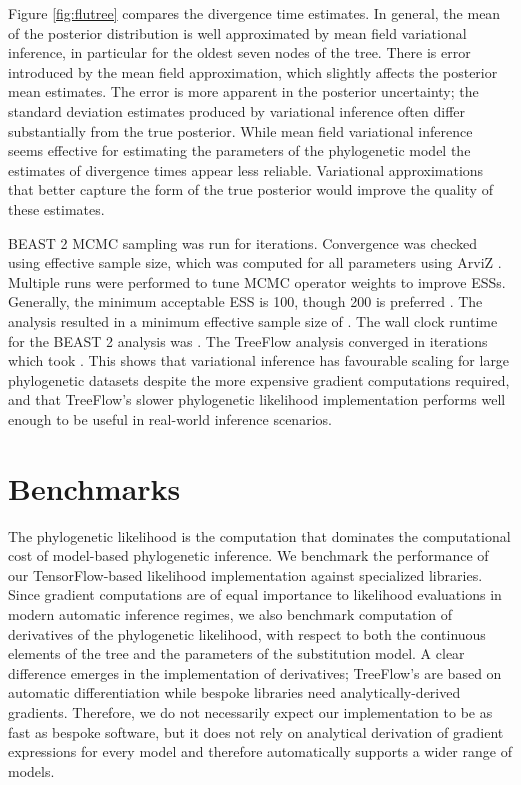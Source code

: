 Figure \ref{fig:flutree} compares the divergence time estimates. In general, the mean of the posterior distribution is well approximated by mean field variational inference, in particular for the oldest seven nodes of the tree. There is error introduced by the mean field approximation, which slightly affects the posterior mean estimates. The error is more apparent in the posterior uncertainty; the standard deviation estimates produced by variational inference often differ substantially from the true posterior. While mean field variational inference seems effective for estimating the parameters of the phylogenetic model the estimates of divergence times appear less reliable. Variational approximations that better capture the form of the true posterior would improve the quality of these estimates.

BEAST 2 MCMC sampling was run for  iterations. Convergence was checked using effective sample size, which was computed for all parameters using ArviZ \cite{kumar2019arviz}. Multiple runs were performed to tune MCMC operator weights to improve ESSs. Generally, the minimum acceptable ESS is 100, though 200 is preferred \cite{drummond2015bayesian}. The analysis resulted in a minimum effective sample size of . The wall clock runtime for the BEAST 2 analysis was . The TreeFlow analysis converged in  iterations which took . This shows that variational inference has favourable scaling for large phylogenetic datasets despite the more expensive gradient computations required, and that TreeFlow's slower phylogenetic likelihood implementation performs well enough to be useful in real-world inference scenarios.

\section{Benchmarks}

The phylogenetic likelihood is the computation that dominates the computational cost of model-based phylogenetic inference. We benchmark the performance of our TensorFlow-based likelihood implementation against specialized libraries. Since gradient computations are of equal importance to likelihood evaluations in modern automatic inference regimes, we also benchmark computation of derivatives of the phylogenetic likelihood, with respect to both the continuous elements of the tree and the parameters of the substitution model. A clear difference emerges in the implementation of derivatives; TreeFlow's are based on automatic differentiation while bespoke libraries need analytically-derived gradients. Therefore, we do not necessarily expect our implementation to be as fast as bespoke software, but it does not rely on analytical derivation of gradient expressions for every model and therefore automatically supports a wider range of models.

